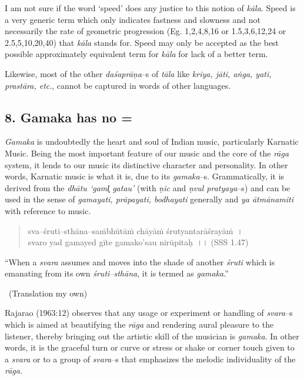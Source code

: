 I am not sure if the word ‘speed’ does any justice to this notion of \textit{kāla}. Speed is a very generic term which only indicates fastness and slowness and not necessarily the rate of geometric progression (Eg. 1,2,4,8,16 or 1.5,3,6,12,24 or 2.5,5,10,20,40) that \textit{kāla} stands for. Speed may only be accepted as the best possible approximately equivalent term for \textit{kāla} for lack of a better term.

Likewise, most of the other \textit{daśaprāṇa}–s of \textit{tāla} like \textit{kriya, jāti, aṅga, yati, prastāra, etc}., cannot be captured in words of other languages.


\subsection*{8. Gamaka has no =}

\textit{Gamaka} is undoubtedly the heart and soul of Indian music, particularly Karnatic Music. Being the most important feature of our music and the core of the \textit{rāga} system, it lends to our music its distinctive character and personality. In other words, Karnatic music is what it is, due to its \textit{gamaka}–s. Grammatically, it is derived from the \textit{dhātu ‘gaml̥ gatau’} (with \textit{ṇic} and \textit{ṇvul pratyaya}–s) and can be used in the sense of \textit{gamayati, prāpayati, bodhayati} generally and \textit{ya ātmānamiti} with reference to music.

\begin{verse}
sva–śruti–sthāna–saṁbhūtāṁ chāyāṁ śrutyantarāśrayāṁ~।\\ svaro yad gamayed gīte gamako’sau nirūpitaḥ~।। (SSS 1.47)
\end{verse}

\begin{myquote}
“When a \textit{svara} assumes and moves into the shade of another \textit{śruti} which is emanating from its own \textit{śruti–sthāna}, it is termed as \textit{gamaka}.” 

~\hfill (Translation my own)
\end{myquote}

Rajarao (1963:12) observes that any usage or experiment or handling of \textit{svara}–s which is aimed at beautifying the \textit{rāga} and rendering aural pleasure to the listener, thereby bringing out the artistic skill of the musician is \textit{gamaka}. In other words, it is the graceful turn or curve or stress or shake or corner touch given to a \textit{svara} or to a group of \textit{svara}–s that emphasizes the melodic individuality of the \textit{rāga}.

